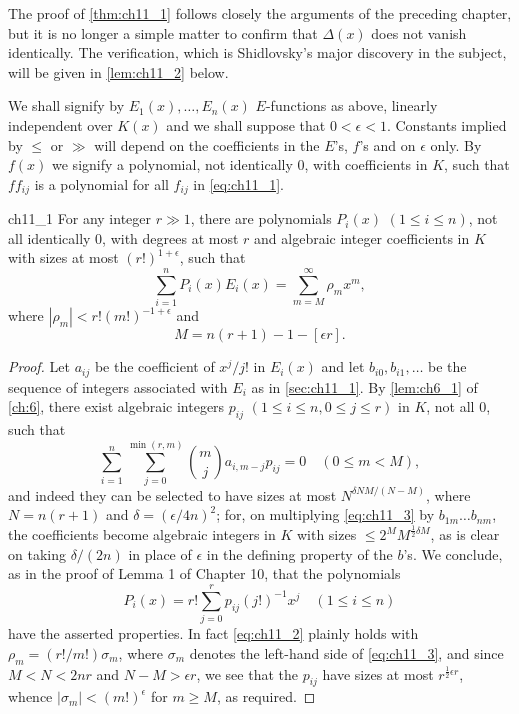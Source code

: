 The proof of \autoref{thm:ch11_1} follows closely the arguments of the preceding chapter, but it is no longer a simple matter to confirm that $\Delta(x)$ does not vanish identically. The verification, which is Shidlovsky's major discovery in the subject, will be given in \autoref{lem:ch11_2} below.

We shall signify by $E_1(x), \dots, E_n(x)$ $E$-functions as above, linearly independent over $K(x)$ and we shall suppose that $0 < \epsilon < 1$. Constants implied by $\leqslant$ or $\gg$ will depend on the coefficients in the $E$'s, $f$'s and on $\epsilon$ only. By $f(x)$ we signify a polynomial, not identically 0, with coefficients in $K$, such that $f f_{ij}$ is a polynomial for all $f_{ij}$ in \eqref{eq:ch11_1}.

\begin{mylemma}{}{ch11_1}
For any integer $r \gg 1$, there are polynomials $P_i(x)$ $(1 \leqslant i \leqslant n)$, not all identically 0, with degrees at most $r$ and algebraic integer coefficients in $K$ with sizes at most $(r!)^{1+\epsilon}$, such that
\[\sum_{i=1}^{n} P_i(x) E_i(x) = \sum_{m=M}^{\infty} \rho_m x^m, \tag{2}\label{eq:ch11_2}\]
where $|\rho_m| < r! (m!)^{-1+\epsilon}$ and
\[M = n(r+1) - 1 - [\epsilon r].\]
\end{mylemma}

\begin{proof}
Let $a_{ij}$ be the coefficient of $x^j/j!$ in $E_i(x)$ and let $b_{i0}, b_{i1}, \ldots$ be the sequence of integers associated with $E_i$ as in \autoref{sec:ch11_1}. By \autoref{lem:ch6_1} of \autoref{ch:6}, there exist algebraic integers $p_{ij}$ $(1 \le i \le n, 0 \le j \le r)$ in $K$, not all 0, such that
\[\sum_{i=1}^{n} \sum_{j=0}^{\min(r, m)} \binom{m}{j} a_{i, m-j} p_{ij} = 0 \quad (0 \le m < M), \tag{3}\label{eq:ch11_3}\]
and indeed they can be selected to have sizes at most $N^{\delta NM/(N-M)}$, where $N=n(r+1)$ and $\delta=(\epsilon/4n)^2$; for, on multiplying \eqref{eq:ch11_3} by $b_{1m}\dots b_{nm}$, the coefficients become algebraic integers in $K$ with sizes $\leq 2^M M^{\frac{1}{2}\delta M}$, as is clear on taking $\delta/(2n)$ in place of $\epsilon$ in the defining property of the $b$'s. We conclude, as in the proof of Lemma 1 of Chapter 10, that the polynomials
\[P_i(x) = r! \sum_{j=0}^{r} p_{ij}(j!)^{-1} x^j \quad (1 \le i \le n)\]
have the asserted properties. In fact \eqref{eq:ch11_2} plainly holds with $\rho_m = (r!/m!)\sigma_m$, where $\sigma_m$ denotes the left-hand side of \eqref{eq:ch11_3}, and since $M < N < 2nr$ and $N - M > \epsilon r$, we see that the $p_{ij}$ have sizes at most $r^{\frac{1}{2}\epsilon r}$, whence $|\sigma_m| < (m!)^{\epsilon}$ for $m \ge M$, as required.
\end{proof}

